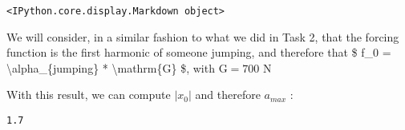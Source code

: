\begin{verbatim}
<IPython.core.display.Markdown object>
\end{verbatim}

We will consider, in a similar fashion to what we did in Task 2, that
the forcing function is the first harmonic of someone jumping, and
therefore that \$ f\_0 = \textbackslash alpha\_\{jumping\} *
\textbackslash mathrm\{G\} \$, with \(\mathrm{G} = 700 \text{ N}\)

With this result, we can compute \(\left | x_0 \right |\) and therefore
\(a_{max}\) :

\begin{Shaded}
\begin{Highlighting}[]
\OperatorTok{=}\OperatorTok{*}  

\end{Highlighting}
\end{Shaded}

\begin{verbatim}
1.7
\end{verbatim}
